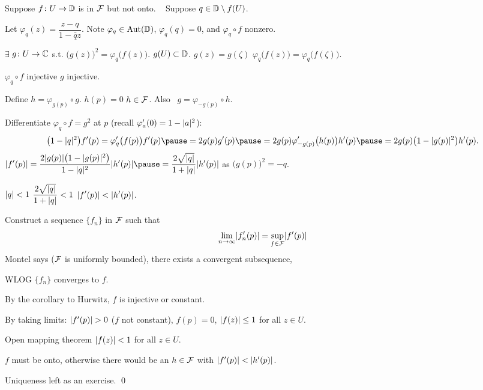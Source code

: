 \documentclass[10pt,aspectratio=169]{beamer}
\begin{document}
\begin{frame}
Suppose $f \colon U \to {\mathbb{D}}$ is in ${\mathcal{F}}$ but not onto.
\pause
~
Suppose $q \in {\mathbb{D}} \setminus f(U)$.

\pause
Let $\varphi_q(z) = \dfrac{z-q}{1-\bar{q}z}$.
\quad
Note $\varphi_q \in \operatorname{Aut}({\mathbb{D}})$, \quad $\varphi_q(q)=0$, \quad
and $\varphi_q \circ f$ nonzero.

\pause
$\exists$ $g \colon U \to {\mathbb{C}}$ s.t.
${\bigl(g(z)\bigr)}^2 = \varphi_q\bigl(f(z)\bigr)$.
\pause
\quad
$g(U) \subset {\mathbb{D}}$.
\pause
\quad
$g(z)=g(\zeta)$ \wthus $\varphi_q\bigl(f(z)\bigr)=\varphi_q\bigl(f(\zeta)\bigr)$.

\pause
$\varphi_q \circ f$ injective \wthus $g$ injective.
\quad

\pause
\medskip

Define
$h = \varphi_{g(p)} \circ g$.
\quad \pause
$h(p) =0$ \wthus $h \in {\mathcal{F}}$.
\pause
\quad
Also
~$g = \varphi_{-g(p)} \circ h$.

\pause
\medskip

Differentiate
$\varphi_q \circ f = g^2$ at $p$ (recall $\varphi_a'(0) = 1-\lvert {a} \rvert^2$):
\pause
\[
\bigl(1-\sabs{q}^2\bigr) f'(p)
= \varphi_q'\bigl(f(p)\bigr) f'(p)
\pause
= 2 g(p) g'(p)
\pause
= 2 g(p) \varphi_{-g(p)}'\bigl(h(p)\bigr) h'(p)
\pause
= 2 g(p) \bigl(1-\sabs{g(p)}^2\bigr) h'(p) .
\]
\pause
$\displaystyle
\sabs{f'(p)} =
\frac{2 \sabs{g(p)} \bigl(1-\sabs{g(p)}^2\bigr)}{1-\sabs{q}^2} \sabs{h'(p)}
\pause
=
\frac{2 \sqrt{\sabs{q}}}{1+\sabs{q}} \sabs{h'(p)}
$
\qquad as
${\bigl(g(p)\bigr)}^2 = -q$.

\pause
\medskip

$\lvert {q} \rvert < 1$
\wthus
$\displaystyle \frac{2 \sqrt{\lvert {q} \rvert}}{1+\lvert {q} \rvert} < 1$
\wthus
$\displaystyle \lvert {f'(p)} \rvert < \lvert {h'(p)} \rvert$.
\end{frame}

\begin{frame}
Construct a sequence $\{ f_n \}$ in  ${\mathcal{F}}$ such that 
\[
\lim_{n \to \infty} \lvert {f_n'(p)} \rvert = \sup_{f \in {\mathcal{F}}} \lvert {f'(p)} \rvert
\]
\pause
Montel says (${\mathcal{F}}$ is uniformly bounded),
there exists a convergent subsequence,

\pause
WLOG $\{ f_n \}$ converges to $f$.

\medskip
\pause

By the corollary to Hurwitz, $f$ is injective or constant.

\medskip
\pause
By taking limits: $\lvert {f'(p)} \rvert > 0$ ($f$ not constant),
\pause
\quad
$f(p) = 0$,
\pause
\quad
$\lvert {f(z)} \rvert \leq 1$ for all $z \in U$.

\pause
Open mapping theorem \wthus
$\lvert {f(z)} \rvert < 1$ for all $z \in U$.

\medskip
\pause
$f$ must be onto, otherwise there would be an $h \in {\mathcal{F}}$ with
$\lvert {f'(p)} \rvert < \lvert {h'(p)} \rvert$.

\medskip
\pause
Uniqueness left as an exercise. \qed
\end{frame}
\end{document}
